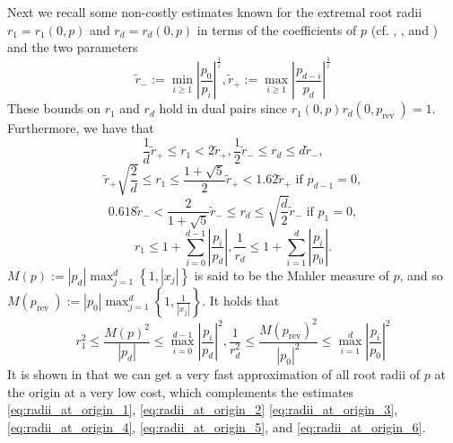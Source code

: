 \documentclass[runningheads]{llncs}
\begin{document}
Next we recall some non-costly estimates known for the extremal root radii $r_{1}=r_{1}(0, p)$ and $r_{d}=r_{d}(0, p)$ in terms of the coefficients of $p$ (cf. \cite{kerimov1977applied}, \cite{mignotte1999polynomials}, and \cite{yap2000fundamental}) and the two parameters
\begin{equation}\label{eq:radii_at_origin_1}
\tilde{r}_{-}:=\min _{i \geq 1}\left|\frac{p_{0}}{p_{i}}\right|^{\frac{1}{i}}, \tilde{r}_{+}:=\max _{i \geq 1}\left|\frac{p_{d-i}}{p_{d}}\right|^{\frac{1}{i}}
\end{equation}
These bounds on $r_{1}$ and $r_{d}$ hold in dual pairs since $r_{1}(0, p) r_{d}\left(0, p_{\text {rev }}\right)=1$.
Furthermore, we have that
\begin{equation}\label{eq:radii_at_origin_2}
\frac{1}{d} \tilde{r}_{+} \leq r_{1}<2 \tilde{r}_{+}, \frac{1}{2} \tilde{r}_{-} \leq r_{d} \leq d \tilde{r}_{-},
\end{equation}
\begin{equation}\label{eq:radii_at_origin_3}
\tilde{r}_{+} \sqrt{\frac{2}{d}} \leq r_{1} \leq \frac{1+\sqrt{5}}{2} \tilde{r}_{+}<1.62 \tilde{r}_{+} \text { if } p_{d-1}=0,
\end{equation}
\begin{equation}\label{eq:radii_at_origin_4}
0.618 \tilde{r}_{-}<\frac{2}{1+\sqrt{5}} \tilde{r}_{-} \leq r_{d} \leq \sqrt{\frac{d}{2}} \tilde{r}_{-} \text { if } p_{1}=0,
\end{equation}
\begin{equation}\label{eq:radii_at_origin_5}
r_{1} \leq 1+\sum_{i=0}^{d-1}\left|\frac{p_{i}}{p_{d}}\right|, \frac{1}{r_{d}} \leq 1+\sum_{i=1}^{d}\left|\frac{p_{i}}{p_{0}}\right| .
\end{equation}
$M(p):=\left|p_{d}\right| \max _{j=1}^{d}\left\{1,\left|x_{j}\right|\right\}$ is said to be the Mahler measure of $p$, and so $M\left(p_{\text {rev }}\right):=\left|p_{0}\right| \max _{j=1}^{d}\left\{1, \frac{1}{\left|x_{j}\right|}\right\} .$ It holds that
\begin{equation}\label{eq:radii_at_origin_6}
r_{1}^{2} \leq \frac{M(p)^{2}}{\left|p_{d}\right|} \leq \max _{i=0}^{d-1}\left|\frac{p_{i}}{p_{d}}\right|^{2}, \frac{1}{r_{d}^{2}} \leq \frac{M\left(p_{\mathrm{rev}}\right)^{2}}{\left|p_{0}\right|^{2}} \leq \max _{i=1}^{d}\left|\frac{p_{i}}{p_{0}}\right|^{2}
\end{equation}
It is shown in \cite{imbach2021rootradii} that we can get a very fast approximation of all root radii of $p$ at the origin at a very low cost, which complements the estimates \ref{eq:radii_at_origin_1}, \ref{eq:radii_at_origin_2} \ref{eq:radii_at_origin_3}, \ref{eq:radii_at_origin_4}, \ref{eq:radii_at_origin_5}, and \ref{eq:radii_at_origin_6}.
\end{document}
